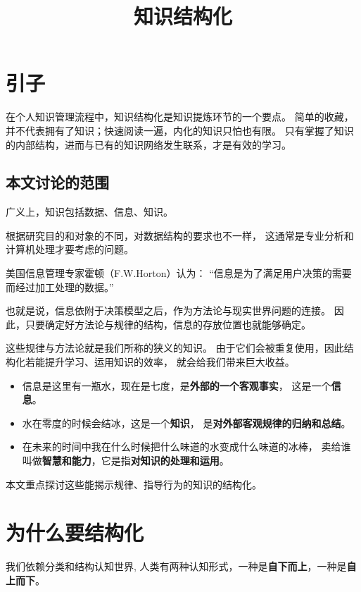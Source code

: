 \documentclass[../main.tex]{subfiles}
\title{知识结构化}
\begin{document}
\maketitle
%
\section{引子}
在个人知识管理流程中，知识结构化是知识提炼环节的一个要点。
简单的收藏，并不代表拥有了知识；快速阅读一遍，内化的知识只怕也有限。
只有掌握了知识的内部结构，进而与已有的知识网络发生联系，才是有效的学习。
%
\subsection{本文讨论的范围}
广义上，知识包括数据、信息、知识。

根据研究目的和对象的不同，对数据结构的要求也不一样，
这通常是专业分析和计算机处理才要考虑的问题。

美国信息管理专家霍顿（F.W.Horton）认为：
``信息是为了满足用户决策的需要而经过加工处理的数据。''

也就是说，信息依附于决策模型之后，作为方法论与现实世界问题的连接。
因此，只要确定好方法论与规律的结构，信息的存放位置也就能够确定。

这些规律与方法论就是我们所称的狭义的知识。
由于它们会被重复使用，因此结构化若能提升学习、运用知识的效率，
就会给我们带来巨大收益。
%
\begin{itemize}
  \item 信息是这里有一瓶水，现在是七度，是\textbf{外部的一个客观事实}，
    这是一个\textbf{信息}。
  \item 水在零度的时候会结冰，这是一个\textbf{知识}，
    是\textbf{对外部客观规律的归纳和总结}。
  \item 在未来的时间中我在什么时候把什么味道的水变成什么味道的冰棒，
    卖给谁叫做\textbf{智慧和能力}，它是指\textbf{对知识的处理和运用}。
\end{itemize}
%
本文重点探讨这些能揭示规律、指导行为的知识的结构化。
%
\section{为什么要结构化}
我们依赖分类和结构认知世界,
人类有两种认知形式，一种是\textbf{自下而上}，一种是\textbf{自上而下}。
\\
\end{document}
